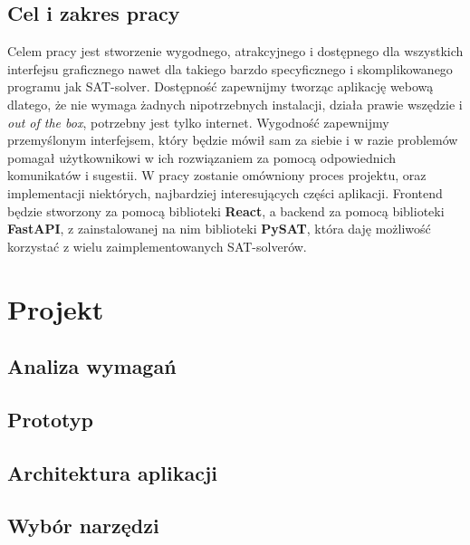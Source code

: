 \documentclass[a4paper,12pt,oneside]{book}
\theoremstyle{definition}
\begin{document}
\section{Cel i zakres pracy}

Celem pracy jest stworzenie wygodnego, atrakcyjnego i dostępnego dla wszystkich interfejsu graficznego nawet dla takiego barzdo specyficznego i skomplikowanego programu jak SAT-solver. Dostępność zapewnijmy tworząc aplikację webową dlatego, że nie wymaga żadnych nipotrzebnych instalacji, działa prawie wszędzie i \textit{out of the box}, potrzebny jest tylko internet. Wygodność zapewnijmy przemyślonym interfejsem, który będzie mówił sam za siebie i w razie problemów pomagał użytkownikowi w ich rozwiązaniem za pomocą odpowiednich komunikatów i sugestii. W pracy zostanie omówniony proces projektu, oraz implementacji niektórych, najbardziej interesujących części aplikacji. Frontend będzie stworzony za pomocą biblioteki \textbf{React}, a backend za pomocą biblioteki \textbf{FastAPI}, z zainstalowanej na nim biblioteki \textbf{PySAT}, która daję możliwość korzystać z wielu zaimplementowanych SAT-solverów. 

\chapter{Projekt}

\section{Analiza wymagań}

\lipsum[1]

\lipsum[2]

\lipsum[3]

\section{Prototyp}

\lipsum[1]

\lipsum[2]

\lipsum[3]

\section{Architektura aplikacji}

\lipsum[1]

\lipsum[2]

\lipsum[3]

\section{Wybór narzędzi}
\end{document}
